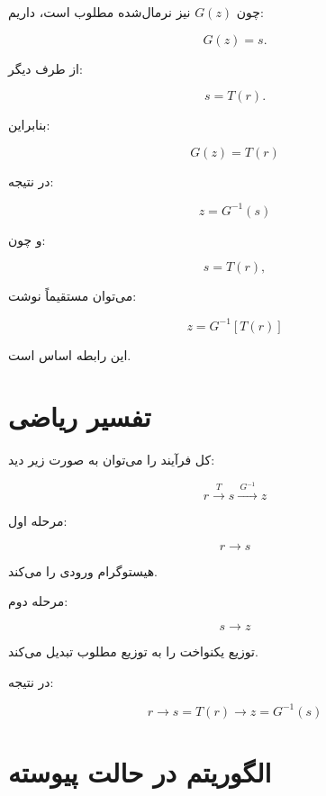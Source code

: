 \documentclass[12pt,a4paper]{article}
\begin{document}
	چون $G(z)$ نیز  نرمال‌شده  مطلوب است، داریم:
	
	\[
	G(z)=s.
	\]
	
	از طرف دیگر:
	
	\[
	s=T(r).
	\]
	
	بنابراین:
	
	\[
	\boxed{
		G(z)=T(r)
	}
	\tag{16}
	\]
	
	در نتیجه:
	
	\[
	\boxed{
		z=G^{-1}(s)
	}
	\tag{17}
	\]
	
	و چون:
	
	\[
	s=T(r),
	\]
	
	می‌توان مستقیماً نوشت:
	
	\[
	\boxed{
		z=G^{-1}[T(r)]
	}
	\tag{18}
	\]
	
	این رابطه اساس  است.
	
	
	\section{تفسیر ریاضی }
	
	کل فرآیند را می‌توان به صورت زیر دید:
	
	\[
	r
	\xrightarrow{\ T\ }
	s
	\xrightarrow{\ G^{-1}\ }
	z
	\]
	
	مرحله اول:
	
	\[
	r\rightarrow s
	\]
	
	هیستوگرام ورودی را  می‌کند.
	
	مرحله دوم:
	
	\[
	s\rightarrow z
	\]
	
	توزیع یکنواخت را به توزیع مطلوب تبدیل می‌کند.
	
	در نتیجه:
	
	\[
	\boxed{
		r
		\rightarrow
		s=T(r)
		\rightarrow
		z=G^{-1}(s)
	}
	\]
	
	
	\section{الگوریتم  در حالت پیوسته}
	
\end{document}
